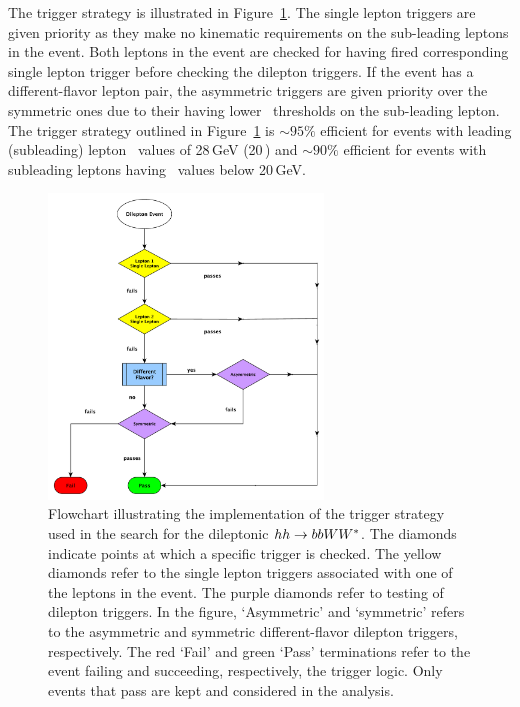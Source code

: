 The trigger strategy is illustrated in Figure~\ref{fig:hh_trig_flowchart}.
The single lepton triggers are given priority as they make no kinematic requirements on the
sub-leading leptons in the event.
Both leptons in the event are checked for having fired corresponding single lepton trigger before
checking the dilepton triggers.
If the event has a different-flavor lepton pair, the asymmetric triggers are given priority over the symmetric ones due to their having
lower \pT~thresholds on the sub-leading lepton.
The trigger strategy outlined in Figure~\ref{fig:hh_trig_flowchart} is $\sim 95\%$ efficient for events
with leading (subleading) lepton \pT~values of 28\,GeV (20\,\GeV) and $\sim 90\%$ efficient for events
with subleading leptons having \pT~values below 20\,GeV.

\begin{figure}[!htb]
    \begin{center}
        \includegraphics[width=0.65\textwidth]{figures/common_ana/trig/updated_trigger_logic_feb26PDF}
        \caption{
            Flowchart illustrating the implementation of the trigger strategy used in the
            search for the dileptonic $hh \rightarrow bbWW^*$.
            The diamonds indicate points at which a specific trigger is checked.
            The yellow diamonds refer to the single lepton triggers associated with one of the leptons in the event.
            The purple diamonds refer to testing of dilepton triggers.
            In the figure, `Asymmetric' and `symmetric' refers to the asymmetric and symmetric different-flavor
            dilepton triggers, respectively.
            The red `Fail' and green `Pass' terminations refer to the event failing and succeeding,
            respectively, the trigger logic.
            Only events that pass are kept and considered in the analysis.
        }
        \label{fig:hh_trig_flowchart}
    \end{center}
\end{figure}

